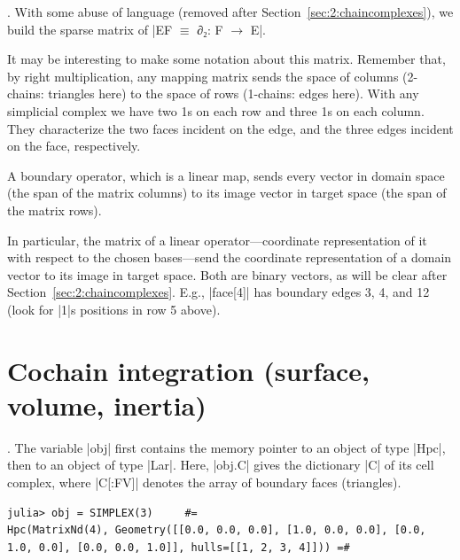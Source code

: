 {\begin{coding}.
With some abuse of language (removed after Section~\ref{sec:2:chaincomplexes}), we build the sparse matrix of |EF $\equiv$ ∂₂: F $\to$ E|. 

It may be interesting to make some notation about this matrix. Remember that, by right multiplication, any mapping matrix sends the space of columns (2-chains: triangles here) to the space of rows (1-chains: edges here). With any simplicial complex we have two 1s on each row and three 1s on each column. They characterize the two faces incident on the edge, and the three edges incident on the face, respectively.
\end{coding}


\begin{coding}
A boundary operator, which is a linear map, sends every vector in domain space (the span of the matrix columns) to its image vector in target space (the span of the matrix rows). 

In particular, the matrix of a linear operator---coordinate representation of it with respect to the chosen bases---send the coordinate representation of a domain vector to its image in target space. Both are binary vectors, as will be clear after Section~\ref{sec:2:chaincomplexes}. E.g.,  |face[4]| has boundary edges 3, 4, and 12 (look for |1|s positions in row 5 above).
\end{coding}


\section{Cochain integration (surface, volume, inertia)}\label{sect:3-4}






\begin{coding}.
The variable |obj| first contains the memory pointer to an object of type |Hpc|, then to an object of type |Lar|. Here, |obj.C| gives the dictionary |C| of its cell complex, where |C[:FV]| denotes the array of boundary faces (triangles).
\begin{lstlisting}[language=JuliaLocal, style=julia, mathescape = true]
julia> obj = SIMPLEX(3) 	#=
Hpc(MatrixNd(4), Geometry([[0.0, 0.0, 0.0], [1.0, 0.0, 0.0], [0.0, 1.0, 0.0], [0.0, 0.0, 1.0]], hulls=[[1, 2, 3, 4]])) =#		


\end{lstlisting}
\end{coding}}

